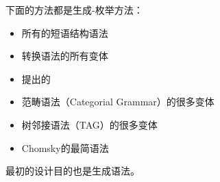 下面的方法都是生成-枚举方法：
\begin{itemize}
\item 所有的短语结构语法
\item 转换语法的所有变体
\item  \citet*{GKPS85a}提出的\gpsgc 
\item 范畴语法\indexcg（Categorial Grammar）的很多变体
\item 树邻接语法\indextag（TAG）的很多变体
\item Chomsky的最简语法
\end{itemize}
\lfg 最初的设计目的也是生成语法。

